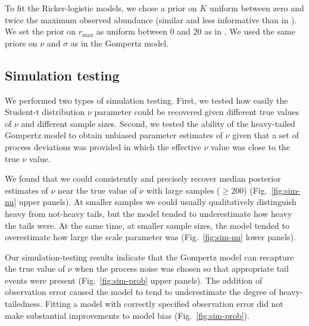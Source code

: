 To fit the Ricker-logistic models, we chose a prior on \(K\) uniform between
zero and twice the maximum observed abundance (similar and less informative
than in \citet{delean2013}). We set the prior on
\(r_\mathrm{max}\) as uniform between 0 and 20 as in \citet{delean2013}. We used the same priors on \(\nu\) and \(\sigma\) as in
the Gompertz model.

\subsection{Simulation testing}
We performed two types of simulation testing.
First, we tested how easily the Student-t distribution \(\nu\) parameter could
be recovered given different true values of \(\nu\) and different sample sizes.
Second, we tested the ability of the heavy-tailed Gompertz model to obtain
unbiased parameter estimates of \(\nu\) given that a set of process deviations
was provided in which the effective \(\nu\) value was close to the true \(\nu\)
value.

We found that we could consistently and precisely recover median posterior
estimates of \(\nu\) near the true value of \(\nu\) with large samples (\(\ge
200\)) (Fig.~\ref{fig:sim-nu} upper panels). At smaller samples we could
usually qualitatively distinguish heavy from not-heavy tails, but the model
tended to underestimate how heavy the tails were. At the same time, at smaller
sample sizes, the model tended to overestimate how large the scale parameter
was (Fig.~\ref{fig:sim-nu} lower panels).

Our simulation-testing results indicate that the Gompertz model can recapture
the true value of \(\nu\) when the process noise was chosen so that appropriate
tail events were present (Fig.~\ref{fig:sim-prob} upper panels). The addition
of observation error caused the model to tend to underestimate the degree of
heavy-tailedness. Fitting a model with correctly specified observation error
did not make substantial improvements to model bias (Fig.~\ref{fig:sim-prob}).

